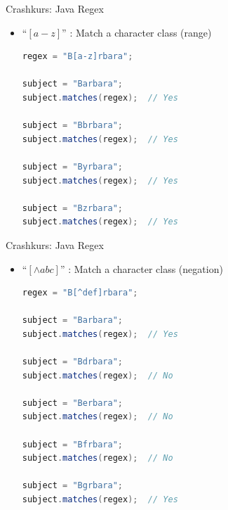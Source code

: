 \documentclass[18pt]{beamer}
\newcommand{\quotes}[1]{``#1''}
\begin{document}
\begin{frame}[fragile]{Crashkurs: Java Regex}
    \begin{itemize}
        \item \Large{\quotes{\alert{\texttt{$\left[a-z\right]$}}}} : Match a character class (range)

        \vspace{.2in}

        \begin{lstlisting}[language=Java,basicstyle=\scriptsize]
regex = "B[a-z]rbara";

subject = "Barbara";
subject.matches(regex);  // Yes

subject = "Bbrbara";
subject.matches(regex);  // Yes

subject = "Byrbara";
subject.matches(regex);  // Yes

subject = "Bzrbara";
subject.matches(regex);  // Yes
        \end{lstlisting}

    \end{itemize}
\end{frame}

\begin{frame}[fragile]{Crashkurs: Java Regex}
    \begin{itemize}
        \item \Large{\quotes{\alert{\texttt{$\left[\wedge abc\right]$}}}} : Match a character class (negation)

        \vspace{.2in}

        \begin{lstlisting}[language=Java,basicstyle=\scriptsize]
regex = "B[^def]rbara";

subject = "Barbara";
subject.matches(regex);  // Yes

subject = "Bdrbara";
subject.matches(regex);  // No

subject = "Berbara";
subject.matches(regex);  // No

subject = "Bfrbara";
subject.matches(regex);  // No

subject = "Bgrbara";
subject.matches(regex);  // Yes
        \end{lstlisting}

    \end{itemize}
\end{frame}
\end{document}
